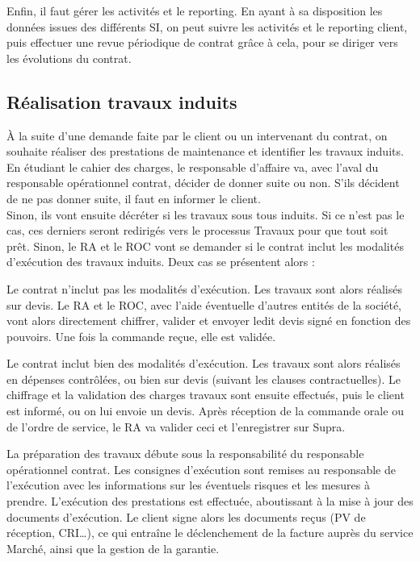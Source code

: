 Enfin, il faut gérer les activités et le reporting. En ayant à sa disposition les données issues des différents SI, on peut suivre les activités et le reporting client, puis effectuer une revue périodique de contrat grâce à cela, pour se diriger vers les évolutions du contrat.

\subsection{Réalisation travaux induits}

À la suite d'une demande faite par le client ou un intervenant du contrat, on souhaite réaliser des prestations de maintenance et identifier les travaux induits. En étudiant le cahier des charges, le responsable d'affaire va, avec l'aval du responsable opérationnel contrat, décider de donner suite ou non. S'ils décident de ne pas donner suite, il faut en informer le client. \\

Sinon, ils vont ensuite décréter si les travaux sous tous induits. Si ce n'est pas le cas, ces derniers seront redirigés vers le processus Travaux pour que tout soit prêt. Sinon, le RA et le ROC vont se demander si le contrat inclut les modalités d'exécution des travaux induits. Deux cas se présentent alors : \\
\begin{description}
\item Le contrat n'inclut pas les modalités d'exécution. Les travaux sont alors réalisés sur devis. Le RA et le ROC, avec l'aide éventuelle d'autres entités de la société, vont alors directement chiffrer, valider et envoyer ledit devis signé en fonction des pouvoirs. Une fois la commande reçue, elle est validée. \\

\item Le contrat inclut bien des modalités d'exécution. Les travaux sont alors réalisés en dépenses contrôlées, ou bien sur devis (suivant les clauses contractuelles). Le chiffrage et la validation des charges travaux sont ensuite effectués, puis le client est informé, ou on lui envoie un devis. Après réception de la commande orale ou de l'ordre de service, le RA va valider ceci et l'enregistrer sur Supra. \\
\end{description}

La préparation des travaux débute sous la responsabilité du responsable opérationnel contrat. Les consignes d'exécution sont remises au responsable de l'exécution avec les informations sur les éventuels risques et les mesures à prendre. L'exécution des prestations est effectuée, aboutissant à la mise à jour des documents d'exécution. Le client signe alors les documents reçus (PV de réception, CRI\dots), ce qui entraîne le déclenchement de la facture auprès du service Marché, ainsi que la gestion de la garantie.

